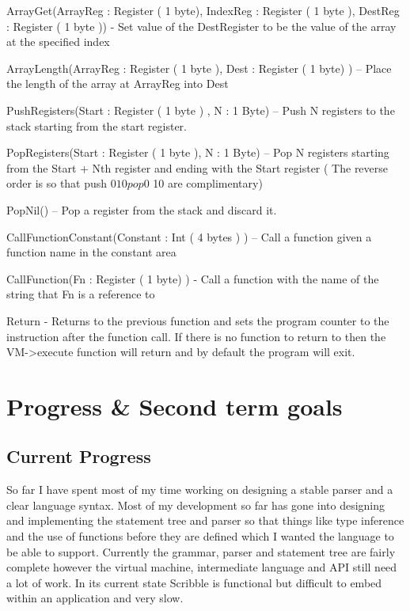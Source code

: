 \documentclass[]{final_report}
\begin{document}
ArrayGet(ArrayReg : Register ( 1 byte), IndexReg : Register ( 1 byte ), DestReg : Register ( 1
byte )) - Set value of the DestRegister to be the value of the array at the specified index

ArrayLength(ArrayReg : Register ( 1 byte ), Dest : Register ( 1 byte) ) – Place the length of the
array at ArrayReg into Dest

PushRegisters(Start : Register ( 1 byte ) , N : 1 Byte) – Push N registers to the stack starting from
the start register.

PopRegisters(Start : Register ( 1 byte ), N : 1 Byte) – Pop N registers starting from the Start + Nth
register and ending with the Start register ( The reverse order is so that push $0 10 pop $0 10 are
complimentary)

PopNil() – Pop a register from the stack and discard it.

CallFunctionConstant(Constant : Int ( 4 bytes ) ) – Call a function given a function name in the
constant area

CallFunction(Fn : Register ( 1 byte) ) - Call a function with the name of the string that Fn is a
reference to

Return - Returns to the previous function and sets the program counter to the instruction after the
function call. If there is no function to return to then the VM-\textgreater execute function will return and by default the program will exit.

\chapter{Progress \& Second term goals}

\section { Current Progress }

So far I have spent most of my time working on designing a stable parser and a clear language syntax. Most of my development so far has gone into designing and implementing the statement tree and parser so that things like type inference and the use of functions before they are defined which I wanted the language to be able to support. Currently the grammar, parser and statement tree are fairly complete however the virtual machine, intermediate language and API still need a lot of work. In its current state Scribble is functional but difficult to embed within an application and very slow.
\end{document}
